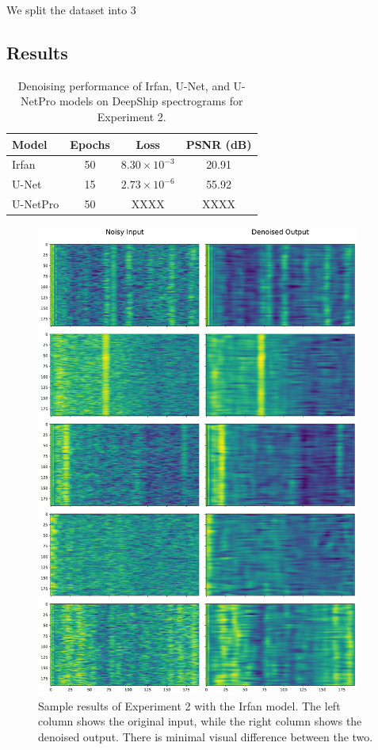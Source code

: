 We split the dataset into 3

\subsection{Results}

\begin{table}[htbp] 
\centering 
\caption{Denoising performance of Irfan, U-Net, and U-NetPro models on DeepShip spectrograms for Experiment 2.} 
\label{tab:denoising-exp-2-results} 
    \begin{tabular}{lccc} 
    \toprule 
    \textbf{Model} & \textbf{Epochs} & \textbf{Loss} & \textbf{PSNR (dB)}\\ \midrule 
    Irfan & 50 & $8.30 \times 10^{-3}$ & 20.91 \\
    U-Net & 15 & $2.73 \times 10^{-6}$ & 55.92 \\
    U-NetPro & 50 & XXXX & XXXX \\ \bottomrule
    \end{tabular} 
\end{table}

\begin{figure}[p]
    \centering
    \includegraphics[width=0.95\textwidth]{img/ch6/in_eq_out/irfan/combined_spectrograms.pdf}
    \caption{Sample results of Experiment 2 with the Irfan model. The left column shows the original input, while the right column shows the denoised output. There is minimal visual difference between the two.}
\end{figure}

